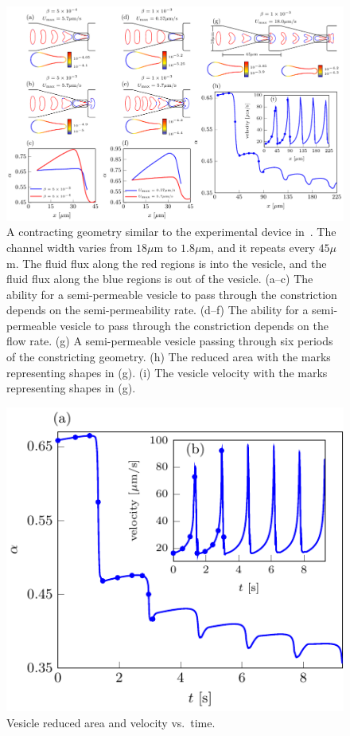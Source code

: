 \documentclass[9pt,twocolumn,twoside,lineno]{pnas-new}
\newif\ifTikz
\begin{document}
\begin{figure}[htp]
  \centering
  \ifTikz
  
  \else
  \includegraphics{figures/contractingComposite.pdf}
  \fi
  \caption{\label{fig:contractingComposite} A contracting geometry
  similar to the experimental device in~\cite{wu2015critical}. The
  channel width varies from $18\mu$m to $1.8\mu$m, and it repeats every
  $45\mu$m. The fluid flux along the red regions is into the vesicle,
  and the fluid flux along the blue regions is out of the vesicle.
  (a--c) The ability for a semi-permeable vesicle to pass through the
  constriction depends on the semi-permeability rate. (d--f) The ability
  for a semi-permeable vesicle to pass through the constriction depends
  on the flow rate. (g) A semi-permeable vesicle passing through six
  periods of the constricting geometry. (h) The reduced area with the
  marks representing shapes in (g). (i) The vesicle velocity with the
  marks representing shapes in (g).}
\end{figure}

\begin{figure}[htp]
  \ifTikz
  
  \else
  \includegraphics{figures/contractingComposite2.pdf}
  \fi
  \caption{\label{fig:contractingComposite2} Vesicle reduced area and
  velocity vs.~time.}
\end{figure}
\end{document}
